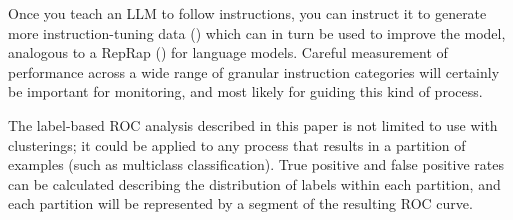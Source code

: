 
Once you teach an LLM to follow instructions, you can instruct it to generate more instruction-tuning data (\cite{wang2023selfinstruct}) which can in turn be used to improve the model, analogous to a RepRap (\cite{jones_reprap_2011}) for language models. Careful measurement of performance across a wide range of granular instruction categories will certainly be important for monitoring, and most likely for guiding this kind of process.

The label-based ROC analysis described in this paper is not limited to use with clusterings; it could be applied to any process that results in a partition of examples (such as multiclass classification). True positive and false positive rates can be calculated describing the distribution of labels within each partition, and each partition will be represented by a segment of the resulting ROC curve.

